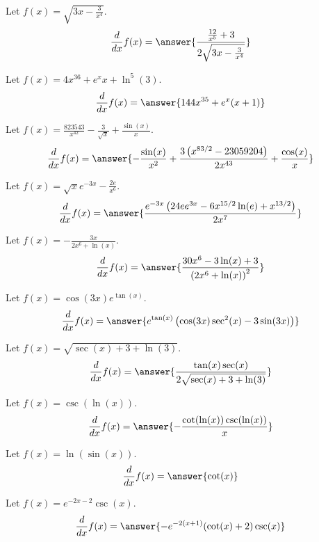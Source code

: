 \documentclass{ximera}
\begin{document}
\begin{shuffle}
\begin{exercise}
Let $f(x)=\sqrt{3 x-\frac{3}{x^4}}$.
\[
\ddx f(x) = \answer{\frac{\frac{12}{x^5}+3}{2 \sqrt{3 x-\frac{3}{x^4}}}}
\]
\end{exercise}

\begin{exercise}
Let $f(x)=4 x^{36}+e^x x+\ln ^5(3)$.
\[
\ddx f(x) = \answer{144 x^{35}+e^x (x+1)}
\]
\end{exercise}

\begin{exercise}
Let $f(x)=\frac{823543}{x^{42}}-\frac{3}{\sqrt{x}}+\frac{\sin (x)}{x}$.
\[
\ddx f(x) = \answer{-\frac{\sin (x)}{x^2}+\frac{3 \left(x^{83/2}-23059204\right)}{2 x^{43}}+\frac{\cos (x)}{x}}
\]
\end{exercise}

\begin{exercise}
Let $f(x)=\sqrt{x} e^{-3 x}-\frac{2 e}{x^6}$.
\[
\ddx f(x) = \answer{\frac{e^{-3 x} \left(24 e e^{3 x}-6 x^{15/2} \ln (e)+x^{13/2}\right)}{2 x^7}}
\]
\end{exercise}

\begin{exercise}
Let $f(x)=-\frac{3 x}{2 x^6+\ln (x)}$.
\[
\ddx f(x) = \answer{\frac{30 x^6-3 \ln (x)+3}{\left(2 x^6+\ln (x)\right)^2}}
\]
\end{exercise}

\begin{exercise}
Let $f(x)=\cos (3 x) e^{\tan (x)}$.
\[
\ddx f(x) = \answer{e^{\tan (x)} \left(\cos (3 x) \sec ^2(x)-3 \sin (3 x)\right)}
\]
\end{exercise}

\begin{exercise}
Let $f(x)=\sqrt{\sec (x)+3+\ln (3)}$.
\[
\ddx f(x) = \answer{\frac{\tan (x) \sec (x)}{2 \sqrt{\sec (x)+3+\ln (3)}}}
\]
\end{exercise}

\begin{exercise}
Let $f(x)=\csc (\ln (x))$.
\[
\ddx f(x) = \answer{-\frac{\cot (\ln (x)) \csc (\ln (x))}{x}}
\]
\end{exercise}

\begin{exercise}
Let $f(x)=\ln (\sin (x))$.
\[
\ddx f(x) = \answer{\cot (x)}
\]
\end{exercise}

\begin{exercise}
Let $f(x)=e^{-2 x-2} \csc (x)$.
\[
\ddx f(x) = \answer{-e^{-2 (x+1)} (\cot (x)+2) \csc (x)}
\]
\end{exercise}


\end{shuffle}
\end{document}
